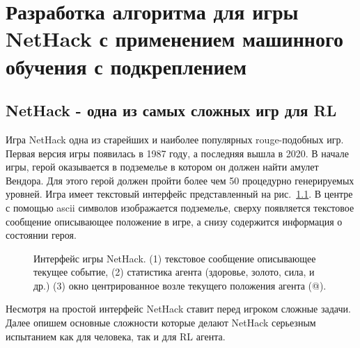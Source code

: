 \chapter{Разработка алгоритма для игры NetHack с применением машинного обучения с подкреплением}\label{ch:ch3}

\section{NetHack - одна из самых сложных игр для RL}

Игра NetHack одна из старейших и наиболее популярных rouge-подобных игр. Первая версия игры появилась в 1987 году, а последняя вышла в 2020. В начале игры, герой оказывается в подземелье в котором он должен найти амулет Вендора. Для этого герой должен пройти более чем 50 процедурно генерируемых уровней. Игра имеет текстовый интерфейс представленный на рис.~\ref{fig:nethack_map}. В центре с помощью ascii символов изображается подземелье, сверху появляется текстовое сообщение описывающее положение в игре, а снизу содержится информация о состоянии героя. 

\begin{figure}[ht]
\caption{Интерфейс игры NetHack. (1) текстовое сообщение описывающее текущее событие, (2) статистика агента (здоровье, золото, сила, и др.) (3) окно центрированное возле текущего положения агента (@).}
    \label{fig:nethack_map}
\end{figure}

Несмотря на простой интерфейс NetHack ставит перед игроком сложные задачи. Далее опишем основные сложности которые делают NetHack серьезным испытанием как для человека, так и для RL агента.

